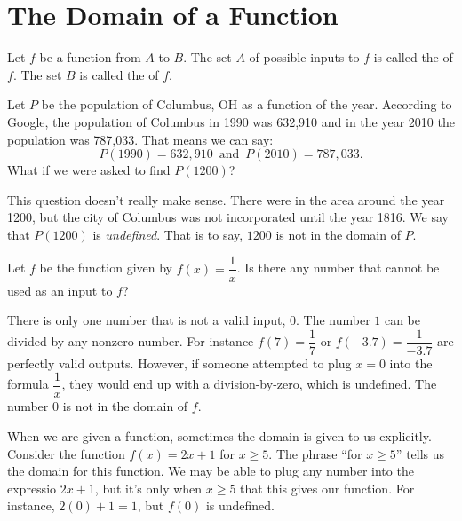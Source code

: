 \documentclass[nooutcomes]{ximera}
\begin{document}
\section{The Domain of a Function}
		
	\begin{definition}
		Let $f$ be a function from $A$ to $B$. The set $A$ of possible inputs to $f$ is called the  of $f$. The set $B$ is called the  of $f$.
	\end{definition}

	\begin{example}
		Let $P$ be the population of Columbus, OH as a function of the year. According to Google, the population of Columbus in 1990 was 632,910 and in the year 2010 the population was 787,033. That means we can say: 
			$$ P(1990) = 632,910 \,\text{ and } \,P(2010) =  787,033. $$
		What if we were asked to find $P(1200)$?
		
		\begin{explanation}
			This question doesn't really make sense. There were  
			in the area around the year 1200, but the city of Columbus was not incorporated until the year 1816. We say that $P(1200)$ is \emph{undefined}. 
			That is to say, $1200$ is not in the domain of $P$.
		\end{explanation}
	\end{example}


	\begin{example}
		Let $f$ be the function given by $f(x) = \dfrac{1}{x}$. Is there any number that cannot be used as an input to $f$?
	
		\begin{explanation}
			There is only one number that is not a valid input, $0$. The number $1$ can be divided by any nonzero number. For instance $f(7) = \dfrac{1}{7}$ or $f(-3.7) = \dfrac{1}{-3.7}$ are perfectly valid outputs. However, if
			someone attempted to plug $x=0$ into the formula $\dfrac{1}{x}$, they would end up with a division-by-zero, which is undefined.  The number $0$ is not in the domain of $f$.
		\end{explanation}
	\end{example}
	
	
	When we are given a function, sometimes the domain is given to us explicitly. Consider the function $f(x) = 2x+1$ for $x \geq 5$. The phrase ``for $x \geq 5$'' tells us the domain for this function. We may be able to plug any 
	number into the expressio $2x+1$, but it's only when $x \geq 5$ that this gives our function. For instance, $2(0)+1 = 1$, but $f(0)$ is undefined.
	
\end{document}
